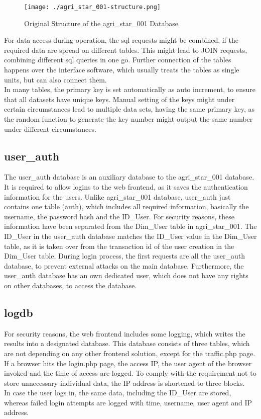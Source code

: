 \begin{figure}[h!]
 \centering
 \texttt{[image: ./agri\_star\_001-structure.png]}
 \caption{Original Structure of the agri\_star\_001 Database}
\end{figure}

\noindent For data access during operation, the sql requests might be combined, if the required data are spread on different tables. This might lead to JOIN requests, combining 
different sql queries in one go. Further connection of the tables happens over the interface software, which usually treats the tables as single units, but can also connect them.\\
In many tables, the primary key is set automatically as auto increment, to ensure that all datasets have unique keys. Manual setting of the keys might under certain circumstances 
lead to multiple data sets, having the same primary key, as the random function to generate the key number might output the same number under different circumstances.

\subsection{user\_auth}

The user\_auth database is an auxiliary database to the agri\_star\_001 database. It is required to allow logins to the web frontend, as it saves the authentication information 
for the users. Unlike agri\_star\_001 database, user\_auth just contains one table (auth), which includes all required information, basically the username, the password hash and the 
ID\_User. For security reasons, these information have been separated from the Dim\_User table in agri\_star\_001. The ID\_User in the user\_auth database matches the ID\_User 
value in the Dim\_User table, as it is taken over from the transaction id of the user creation in the Dim\_User table. During login process, the first requests are all the 
user\_auth database, to prevent external attacks on the main database. Furthermore, the user\_auth database has an own dedicated user, which does not have any rights on other 
databases, to access the database.

\subsection{logdb}
For security reasons, the web frontend includes some logging, which writes the results into a designated database. This database consists of three tables, which are not depending 
on any other frontend solution, except for the traffic.php page. If a browser hits the login.php page, the access IP, the user agent of the browser invoked and the time of access 
are logged. To comply with the requirement not to store unnecessary individual data, the IP address is shortened to three blocks.\\
In case the user logs in, the same data, including the ID\_User are stored, whereas failed login attempts are logged with time, username, user agent and IP address. 